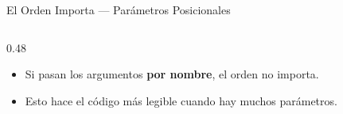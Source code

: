 \documentclass[aspectratio=169, 11pt]{beamer}
\begin{document}
\begin{frame}[fragile,shrink=28]{El Orden Importa --- Parámetros Posicionales}
\begin{columns}[T]
\begin{column}{0.48\textwidth}
      \vspace{2pt}
      {\scriptsize\color{textMuted}
      \begin{itemize}\setlength{\itemsep}{3pt}
        \item[{\color{arcaRed}\scriptsize\faArrowRight}]
          Si pasan los argumentos \textbf{por nombre},
          el orden no importa.
        \item[{\color{arcaRed}\scriptsize\faLightbulb}]
          Esto hace el código más legible
          cuando hay muchos parámetros.
      \end{itemize}
      }
    \end{column}
  \end{columns}
\end{frame}

\end{document}
